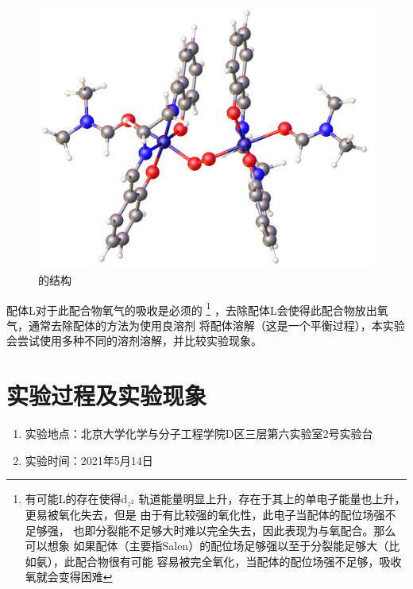 \documentclass[a4paper,zihao=5,UTF8]{ctexart}
\newcommand{\mr}[1]{\mathrm{#1}}
\begin{document}
    \begin{figure}
        \centering 
        \includegraphics[scale=0.08]{Co2Salen2O2L2.png}
        \caption{的结构}
        \label{[Co(II)(Salen)]_2L_2.O_2}
    \end{figure}
    \par  
    配体L对于此配合物氧气的吸收是必须的
    \footnote{有可能L的存在使得$\mr{d}_{z^2}$
    轨道能量明显上升，存在于其上的单电子能量也上升，更易被氧化失去，但是
    由于有比较强的氧化性，此电子当配体的配位场强不足够强，
    也即分裂能不足够大时难以完全失去，因此表现为与氧配合。那么可以想象
    如果配体（主要指Salen）的配位场足够强以至于分裂能足够大（比如氨），此配合物很有可能
    容易被完全氧化，当配体的配位场强不足够，吸收氧就会变得困难}
    ，去除配体L会使得此配合物放出氧气，通常去除配体的方法为使用良溶剂
    将配体溶解（这是一个平衡过程），本实验会尝试使用多种不同的溶剂溶解，并比较实验现象。
    \section{实验过程及实验现象}
    \begin{enumerate}
        \item 实验地点：北京大学化学与分子工程学院D区三层第六实验室2号实验台
        \item 实验时间：2021年5月14日
    \end{enumerate}
\end{document}
